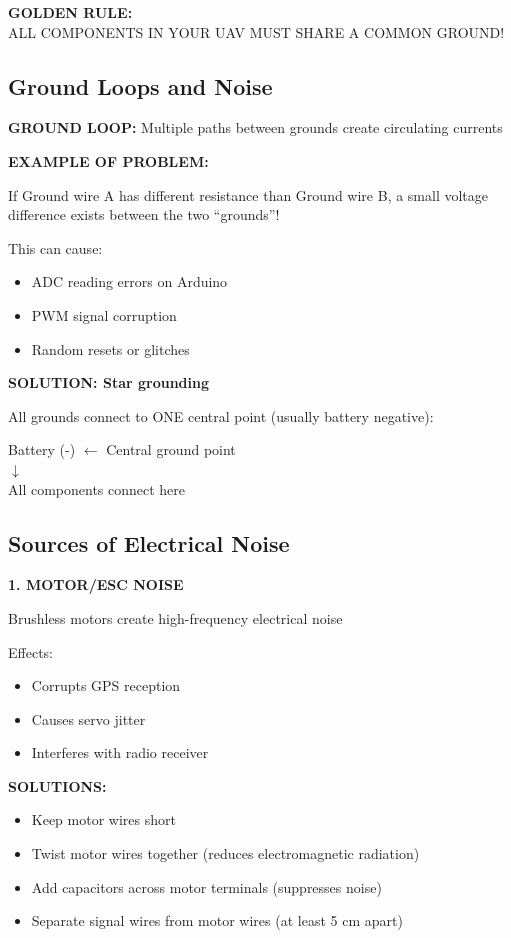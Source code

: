 \documentclass[11pt,letterpaper]{article}
\begin{document}
\begin{keyinsight}
\textbf{GOLDEN RULE:}\\
ALL COMPONENTS IN YOUR UAV MUST SHARE A COMMON GROUND!
\end{keyinsight}

\subsection{Ground Loops and Noise}

\textbf{GROUND LOOP:} Multiple paths between grounds create circulating currents

\textbf{EXAMPLE OF PROBLEM:}

If Ground wire A has different resistance than Ground wire B, a small voltage difference exists between the two ``grounds''!

This can cause:
\begin{itemize}
\item ADC reading errors on Arduino
\item PWM signal corruption
\item Random resets or glitches
\end{itemize}

\textbf{SOLUTION: Star grounding}

All grounds connect to ONE central point (usually battery negative):

\begin{center}
Battery (-) $\leftarrow$ Central ground point\\
$\downarrow$\\
All components connect here
\end{center}

\subsection{Sources of Electrical Noise}

\textbf{1. MOTOR/ESC NOISE}

Brushless motors create high-frequency electrical noise

Effects:
\begin{itemize}
\item Corrupts GPS reception
\item Causes servo jitter
\item Interferes with radio receiver
\end{itemize}

\textbf{SOLUTIONS:}
\begin{itemize}
\item Keep motor wires short
\item Twist motor wires together (reduces electromagnetic radiation)
\item Add capacitors across motor terminals (suppresses noise)
\item Separate signal wires from motor wires (at least 5 cm apart)
\end{itemize}
\end{document}
